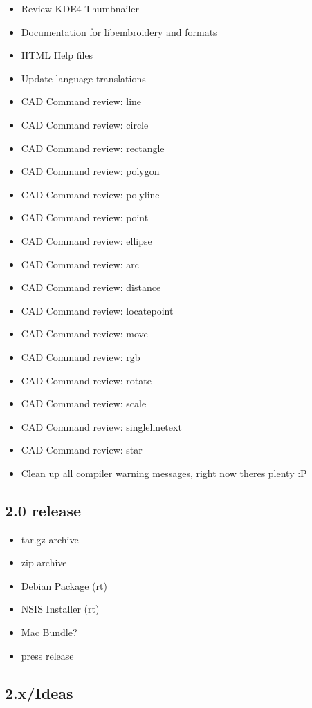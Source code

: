 \documentclass[a4paper]{report}
\begin{document}
\begin{itemize}
\item Review KDE4 Thumbnailer
\item Documentation for libembroidery and formats
\item HTML Help files
\item Update language translations
\item CAD Command review: line
\item CAD Command review: circle
\item CAD Command review: rectangle
\item CAD Command review: polygon
\item CAD Command review: polyline
\item CAD Command review: point
\item CAD Command review: ellipse
\item CAD Command review: arc
\item CAD Command review: distance
\item CAD Command review: locatepoint
\item CAD Command review: move
\item CAD Command review: rgb
\item CAD Command review: rotate
\item CAD Command review: scale
\item CAD Command review: singlelinetext
\item CAD Command review: star
\item Clean up all compiler warning messages, right now theres plenty :P
\end{itemize}

\subsection{2.0 release}

\begin{itemize}
\item tar.gz archive
\item zip archive
\item Debian Package (rt)
\item NSIS Installer (rt)
\item Mac Bundle?
\item press release
\end{itemize}

\subsection{2.x/Ideas}
\end{document}
